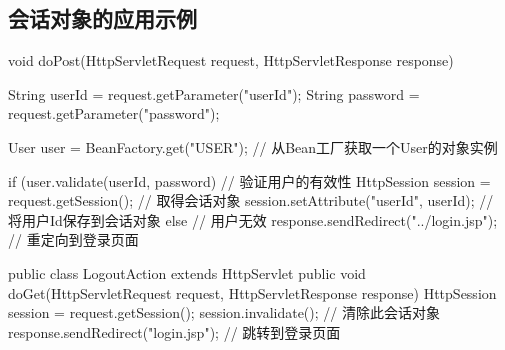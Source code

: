 \subsection{会话对象的应用示例} 


\begin{javaCode}
  void doPost(HttpServletRequest request, HttpServletResponse response) {
    String userId = request.getParameter("userId");
    String password = request.getParameter("password");

    User user = BeanFactory.get("USER"); // 从Bean工厂获取一个User的对象实例
    
    if (user.validate(userId, password) { // 验证用户的有效性
      HttpSession session = request.getSession();  // 取得会话对象
      session.setAttribute("userId", userId);  // 将用户Id保存到会话对象
    } else { // 用户无效
      response.sendRedirect("../login.jsp"); // 重定向到登录页面
    }
  }
\end{javaCode}



\begin{javaCode}
  public class LogoutAction extends HttpServlet {
    public void doGet(HttpServletRequest request, HttpServletResponse response) {
      HttpSession session = request.getSession();
      session.invalidate(); // 清除此会话对象
      response.sendRedirect("login.jsp"); // 跳转到登录页面
    }
  }
\end{javaCode}

